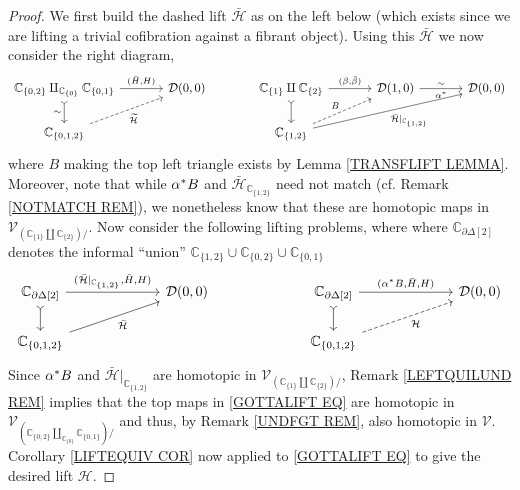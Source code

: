 \documentclass[a4paper,10pt
,draft
]{article}%
\numberwithin{equation}{section}
\numberwithin{figure}{section}
\theoremstyle{definition} %
\newcommand{\V}{\ensuremath{\mathcal V}}
\newcommand{\1}{\ensuremath{\mathbbm 1}}%
\begin{document}
\begin{proof}
We first build the dashed lift $\bar{\mathcal{H}}$
as on the left below (which exists since we are lifting a trivial cofibration against a fibrant object).
Using this $\bar{\mathcal{H}}$ we now consider the right diagram,
\begin{equation}
\begin{tikzcd}[column sep = 35pt]
	\mathbb{C}_{\{0,2\}} 
	\amalg_{\mathbb{C}_{\{0\}}}
	\mathbb{C}_{\{0,1\}} 
	\ar[rightarrowtail]{d}[swap]{\sim}
	\arrow{r}{(\bar{H},H)}
&
	\mathcal{D}(0,0)
&%
	\mathbb{C}_{\{1\}} \amalg \mathbb{C}_{\{2\}}
	\ar[rightarrowtail]{d}
	\arrow{r}{(\beta,\bar{\beta})}
&
	\mathcal{D}(1,0)
	\ar{r}{\sim}[swap]{\alpha^{\**}}
&
	\mathcal{D}(0,0) 
\\
	\mathbb{C}_{\{0,1,2\}}
	\arrow[dashed]{ur}[swap]{\widetilde{\mathcal{H}}}
&
&%
	\mathbb{C}_{\{1,2\}}
	\ar[dashed]{ru}{B}
	\ar{rru}[swap]{\bar{\mathcal{H}}|_{\mathbb{C}_{\{1,2\}}}}
&
&
\end{tikzcd}
\end{equation}
where $B$ making the top left triangle exists by Lemma \ref{TRANSFLIFT LEMMA}.
Moreover, note that while 
$\alpha^{\**}B$ and $\bar{\mathcal{H}}_{\mathbb{C}_{\{1,2\}}}$
need not match (cf. Remark \ref{NOTMATCH REM}),
we nonetheless know that these are homotopic maps
in $\V_{\left(\mathbb{C}_{\{1\}} \amalg \mathbb{C}_{\{2\}}\right)/}$.
Now consider the following lifting problems, 
where
where $\mathbb{C}_{\partial \Delta[2]}$ denotes the informal ``union''
$\mathbb{C}_{\{1,2\}} \cup \mathbb{C}_{\{0,2\}} \cup \mathbb{C}_{\{0,1\}}$
\begin{equation}\label{GOTTALIFT EQ}
\begin{tikzcd}[column sep = 65pt]
	\mathbb{C}_{\partial \Delta[2]}
	\ar[rightarrowtail]{d}
	\arrow{r}{(\bar{\mathcal{H}}|_{\mathbb{C}_{\{1,2\}}},\bar{H},H)}
&
	\mathcal{D}(0,0)
&%
	\mathbb{C}_{\partial \Delta[2]}
	\ar[rightarrowtail]{d}
	\arrow{r}{(\alpha^{\**}B,\bar{H},H)}
&
	\mathcal{D}(0,0)
\\
	\mathbb{C}_{\{0,1,2\}} \ar{ru}[swap]{\bar{\mathcal{H}}}
&
&%
	\mathbb{C}_{\{0,1,2\}} \ar[dashed]{ru}[swap]{\mathcal{H}}
&
\end{tikzcd}
\end{equation}
Since $\alpha^{\**}B$ and $\bar{\mathcal{H}}|_{\mathbb{C}_{\{1,2\}}}$
are homotopic in 
$\V_{\left(\mathbb{C}_{\{1\}} \amalg \mathbb{C}_{\{2\}}\right)/}$,
Remark \ref{LEFTQUILUND REM}
implies that the top maps in \eqref{GOTTALIFT EQ}
are homotopic in 
$\V_{\left(
\mathbb{C}_{\{0,2\}} \amalg_{\mathbb{C}_{\{0\}}} \mathbb{C}_{\{0,1\}}
\right)/}$ and thus,
by Remark \ref{UNDFGT REM}, also homotopic in 
$\V$.
Corollary \ref{LIFTEQUIV COR} now applied to \eqref{GOTTALIFT EQ}
to give the desired lift $\mathcal{H}$.
\end{proof}
\end{document}
